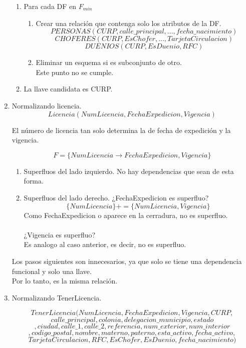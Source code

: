\documentclass{article}
\begin{document}
\begin{enumerate}
\begin{enumerate}
					\item Para cada DF en $F_{min}$
						\begin{enumerate}
							\item Crear una relación que contenga solo los atributos de la DF.
								$$PERSONAS(CURP, calle\_principal, ..., fecha\_nacimiento)$$
							$$CHOFERES(CURP, EsChofer, ..., TarjetaCirculacion)$$
							$$DUENIOS(CURP, EsDuenio, RFC)$$
							\item Eliminar un esquema si es subconjunto de otro.\\
							Este punto no se cumple.
						\end{enumerate}						
					\item La llave candidata es CURP.
				\end{enumerate}
			\item Normalizando licencia.
				$$Licencia(NumLicencia, FechaExpedicion, Vigencia)$$
				
				El número de licencia tan solo determina la de fecha de expedición y la vigencia.
				
				$$F = \{NumLicencia \rightarrow FechaExpedicion,Vigencia\}$$
				\begin{enumerate}
					\item Superfluos del lado izquierdo.
						No hay dependencias que sean de esta forma.
					\item Superfluos del lado derecho.
						¿FechaExpedicion es superfluo?
						$$\{NumLicencia\}+=\{NumLicencia,Vigencia\}$$
						Como FechaExpedicion o aparece en la cerradura, no es superfluo.\\\\
						¿Vigencia es superfluo?\\
						Es analogo al caso anterior, es decir, no es superfluo.																
				\end{enumerate}
			Los pasos siguientes son innecesarios, ya que solo se tiene una dependencia funcional y solo una llave.\\
			Por lo tanto, es la misma relación.
			
			\item Normalizando TenerLicencia.
			
			$$TenerLicencia(NumLicencia, FechaExpedicion, Vigencia, CURP,$$
			$$ calle\_principal, colonia, delegacion\_municipio, estado$$
			$$, ciudad, calle\_1, calle\_2, referencia, num\_exterior, num\_interior$$
			$$,codigo\_postal, nombre, materno, paterno, esta\_activo, fecha\_activo,$$ $$TarjetaCirculacion, RFC, EsChofer, EsDuenio, fecha\_nacimiento)$$
			

\end{enumerate}
\end{document}
